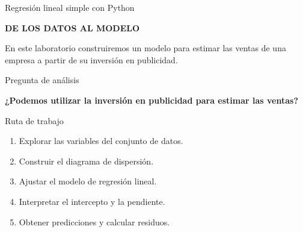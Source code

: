 \documentclass[aspectratio=169,11pt]{beamer}
\newcommand{\kicker}[1]{%
  {\scriptsize\bfseries\color{cAcc}\MakeUppercase{#1}}%
  \par\vspace{0.2em}%
}
\newcommand{\pregunta}[1]{%
  {\color{cAcc}\bfseries #1}%
}
\newenvironment{cerrado}[1]
  {\begin{block}{#1}
   \begin{minipage}{\linewidth}
   \raggedright}
  {\end{minipage}
   \end{block}}
\begin{document}
\begin{frame}{Regresión lineal simple con Python}

  \begin{center}
    \begin{minipage}{0.86\textwidth}

      \kicker{DE LOS DATOS AL MODELO}

      En este laboratorio construiremos un modelo para estimar las
      ventas de una empresa a partir de su inversión en publicidad.

      \vspace{0.4em}

      \begin{cerrado}{Pregunta de análisis}

        \begin{center}
          \pregunta{¿Podemos utilizar la inversión en publicidad
          para estimar las ventas?}
        \end{center}

      \end{cerrado}

      \vspace{0.35em}

      \begin{cerrado}{Ruta de trabajo}

        \begin{enumerate}
          \setlength{\itemsep}{0.2em}

          \item Explorar las variables del conjunto de datos.
          \item Construir el diagrama de dispersión.
          \item Ajustar el modelo de regresión lineal.
          \item Interpretar el intercepto y la pendiente.
          \item Obtener predicciones y calcular residuos.

        \end{enumerate}

      \end{cerrado}

    \end{minipage}
  \end{center}

\end{frame}


\end{document}
